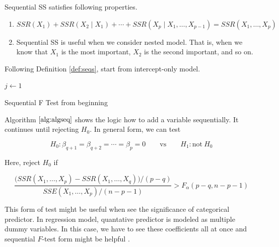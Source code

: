 \documentclass[]{book}
\theoremstyle{definition}
\theoremstyle{definition}
\theoremstyle{definition}
\theoremstyle{remark}
\let\BeginKnitrBlock\begin \let\EndKnitrBlock\end
\begin{document}
\BeginKnitrBlock{remark}
{}Sequential SS satisfies following properties.

\begin{enumerate}
  \item $SSR(X_1) + SSR(X_2 \mid X_1) + \cdots + SSR(X_p \mid X_1, \ldots, X_{p - 1}) = SSR(X_1, \ldots, X_p)$
  \item Sequential SS is useful when we consider nested model. That is, when we know that $X_1$ is the most important, $X_2$ is the second important, and so on.
\end{enumerate}
\EndKnitrBlock{remark}

Following Definition \ref{def:seqs}, start from intercept-only model.

\begin{algorithm}[H] \label{alg:algseq}
  \SetAlgoLined
  $j \leftarrow 1$\;
  \caption{Sequential F Test from beginning}
\end{algorithm}

Algorithm \(\ref{alg:algseq}\) shows the logic how to add a variable sequentially. It continues until rejecting \(H_0\). In general form, we can test

\[H_0: \beta_{q + 1} = \beta_{q + 2} = \cdots = \beta_p = 0 \qquad \text{vs} \qquad H_1: \text{not}\: H_0\]

Here, reject \(H_0\) if

\begin{equation}
  \frac{\Big(SSR(X_1, \ldots, X_p) - SSR(X_1, \ldots, X_q)\Big) / (p - q)}{SSE(X_1, \ldots, X_p) / (n - p - 1)} > F_{\alpha}(p - q, n - p - 1)
  \label{eq:seqgen}
\end{equation}

This form of test might be useful when see the significance of categorical predictor. In regression model, quantative predictor is modeled as multiple dummy variables. In this case, we have to see these coefficients all at once and sequential \(F\)-test form might be helpful \citep{Hastie:2013aa}.
\end{document}
